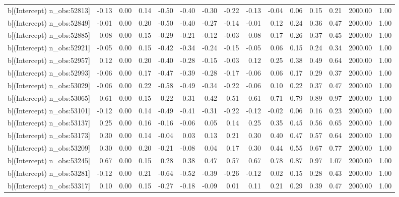 \begin{table}[ht]
\begin{tabular}{rrrrrrrrrrrrrrr}
  b[(Intercept) n\_obs:52813] & -0.13 & 0.00 & 0.14 & -0.50 & -0.40 & -0.30 & -0.22 & -0.13 & -0.04 & 0.06 & 0.15 & 0.21 & 2000.00 & 1.00 \\ 
  b[(Intercept) n\_obs:52849] & -0.01 & 0.00 & 0.20 & -0.50 & -0.40 & -0.27 & -0.14 & -0.01 & 0.12 & 0.24 & 0.36 & 0.47 & 2000.00 & 1.00 \\ 
  b[(Intercept) n\_obs:52885] & 0.08 & 0.00 & 0.15 & -0.29 & -0.21 & -0.12 & -0.03 & 0.08 & 0.17 & 0.26 & 0.37 & 0.45 & 2000.00 & 1.00 \\ 
  b[(Intercept) n\_obs:52921] & -0.05 & 0.00 & 0.15 & -0.42 & -0.34 & -0.24 & -0.15 & -0.05 & 0.06 & 0.15 & 0.24 & 0.34 & 2000.00 & 1.00 \\ 
  b[(Intercept) n\_obs:52957] & 0.12 & 0.00 & 0.20 & -0.40 & -0.28 & -0.15 & -0.03 & 0.12 & 0.25 & 0.38 & 0.49 & 0.64 & 2000.00 & 1.00 \\ 
  b[(Intercept) n\_obs:52993] & -0.06 & 0.00 & 0.17 & -0.47 & -0.39 & -0.28 & -0.17 & -0.06 & 0.06 & 0.17 & 0.29 & 0.37 & 2000.00 & 1.00 \\ 
  b[(Intercept) n\_obs:53029] & -0.06 & 0.00 & 0.22 & -0.58 & -0.49 & -0.34 & -0.22 & -0.06 & 0.10 & 0.22 & 0.37 & 0.47 & 2000.00 & 1.00 \\ 
  b[(Intercept) n\_obs:53065] & 0.61 & 0.00 & 0.15 & 0.22 & 0.31 & 0.42 & 0.51 & 0.61 & 0.71 & 0.79 & 0.89 & 0.97 & 2000.00 & 1.00 \\ 
  b[(Intercept) n\_obs:53101] & -0.12 & 0.00 & 0.14 & -0.49 & -0.41 & -0.31 & -0.22 & -0.12 & -0.02 & 0.06 & 0.16 & 0.23 & 2000.00 & 1.00 \\ 
  b[(Intercept) n\_obs:53137] & 0.25 & 0.00 & 0.16 & -0.16 & -0.06 & 0.05 & 0.14 & 0.25 & 0.35 & 0.45 & 0.56 & 0.65 & 2000.00 & 1.00 \\ 
  b[(Intercept) n\_obs:53173] & 0.30 & 0.00 & 0.14 & -0.04 & 0.03 & 0.13 & 0.21 & 0.30 & 0.40 & 0.47 & 0.57 & 0.64 & 2000.00 & 1.00 \\ 
  b[(Intercept) n\_obs:53209] & 0.30 & 0.00 & 0.20 & -0.21 & -0.08 & 0.04 & 0.17 & 0.30 & 0.44 & 0.55 & 0.67 & 0.77 & 2000.00 & 1.00 \\ 
  b[(Intercept) n\_obs:53245] & 0.67 & 0.00 & 0.15 & 0.28 & 0.38 & 0.47 & 0.57 & 0.67 & 0.78 & 0.87 & 0.97 & 1.07 & 2000.00 & 1.00 \\ 
  b[(Intercept) n\_obs:53281] & -0.12 & 0.00 & 0.21 & -0.64 & -0.52 & -0.39 & -0.26 & -0.12 & 0.02 & 0.15 & 0.28 & 0.43 & 2000.00 & 1.00 \\ 
  b[(Intercept) n\_obs:53317] & 0.10 & 0.00 & 0.15 & -0.27 & -0.18 & -0.09 & 0.01 & 0.11 & 0.21 & 0.29 & 0.39 & 0.47 & 2000.00 & 1.00 \\ 

\end{tabular}
\end{table}
